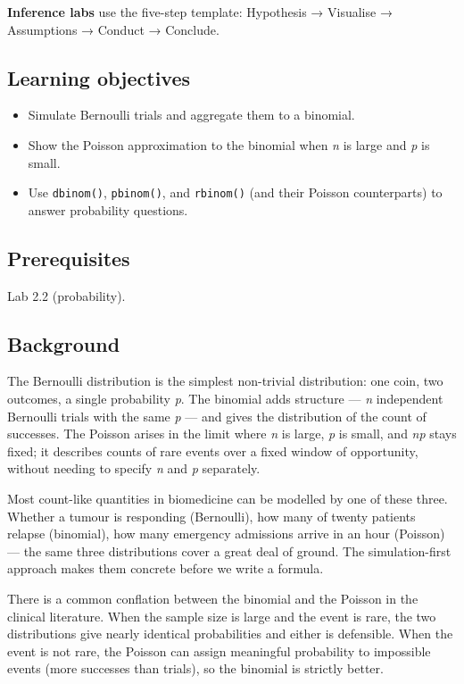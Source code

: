 \documentclass[
]{article}
\author{}
\date{\vspace{-2.5em}}
\providecommand{\tightlist}{%
  \setlength{\itemsep}{0pt}\setlength{\parskip}{0pt}}
\begin{document}
\textbf{Inference labs} use the five-step template: Hypothesis →
Visualise → Assumptions → Conduct → Conclude.

\subsection{Learning objectives}\label{learning-objectives}

\begin{itemize}
\tightlist
\item
  Simulate Bernoulli trials and aggregate them to a binomial.
\item
  Show the Poisson approximation to the binomial when \emph{n} is large
  and \emph{p} is small.
\item
  Use \texttt{dbinom()}, \texttt{pbinom()}, and \texttt{rbinom()} (and
  their Poisson counterparts) to answer probability questions.
\end{itemize}

\subsection{Prerequisites}\label{prerequisites}

Lab 2.2 (probability).

\subsection{Background}\label{background}

The Bernoulli distribution is the simplest non-trivial distribution: one
coin, two outcomes, a single probability \emph{p}. The binomial adds
structure --- \emph{n} independent Bernoulli trials with the same
\emph{p} --- and gives the distribution of the count of successes. The
Poisson arises in the limit where \emph{n} is large, \emph{p} is small,
and \emph{np} stays fixed; it describes counts of rare events over a
fixed window of opportunity, without needing to specify \emph{n} and
\emph{p} separately.

Most count-like quantities in biomedicine can be modelled by one of
these three. Whether a tumour is responding (Bernoulli), how many of
twenty patients relapse (binomial), how many emergency admissions arrive
in an hour (Poisson) --- the same three distributions cover a great deal
of ground. The simulation-first approach makes them concrete before we
write a formula.

There is a common conflation between the binomial and the Poisson in the
clinical literature. When the sample size is large and the event is
rare, the two distributions give nearly identical probabilities and
either is defensible. When the event is not rare, the Poisson can assign
meaningful probability to impossible events (more successes than
trials), so the binomial is strictly better.
\end{document}
